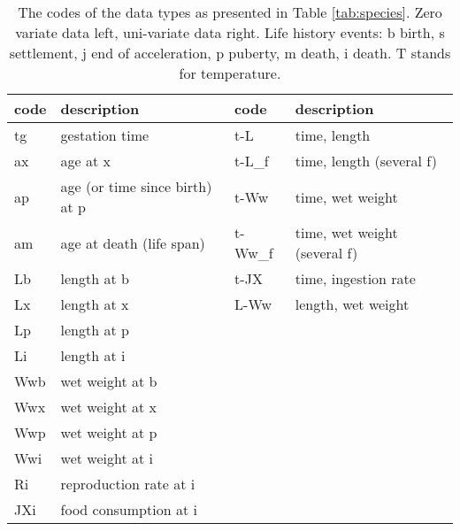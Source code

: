 \begin{table}\small
\caption{\label{tab:codes}\protect\small
The codes of the data types as presented in Table \ref{tab:species}. 
Zero variate data left, uni-variate data right. 
Life history events: b birth, s settlement, j end of acceleration, p puberty, m death, i death. 
T stands for temperature. }
\begin{tabular}{ll|ll} \hline
\textbf{code} & \textbf{description} & \textbf{code} & \textbf{description}\\ \hline
tg & gestation time & t-L & time, length\\ 
ax & age at x & t-L\_f & time, length (several f)\\ 
ap & age (or time since birth) at p & t-Ww & time, wet weight\\ 
am & age at death (life span) & t-Ww\_f & time, wet weight (several f)\\ 
Lb & length at b & t-JX & time, ingestion rate\\ 
Lx & length at x & L-Ww & length, wet weight\\ 
Lp & length at p &   &  \\ 
Li & length at i &   &  \\ 
Wwb & wet weight at b &   &  \\ 
Wwx & wet weight at x &   &  \\ 
Wwp & wet weight at p &   &  \\ 
Wwi & wet weight at i &   &  \\ 
Ri & reproduction rate at i &   &  \\ 
JXi & food consumption at i &   &  \\ 
\hline
\end{tabular}
\end{table}
